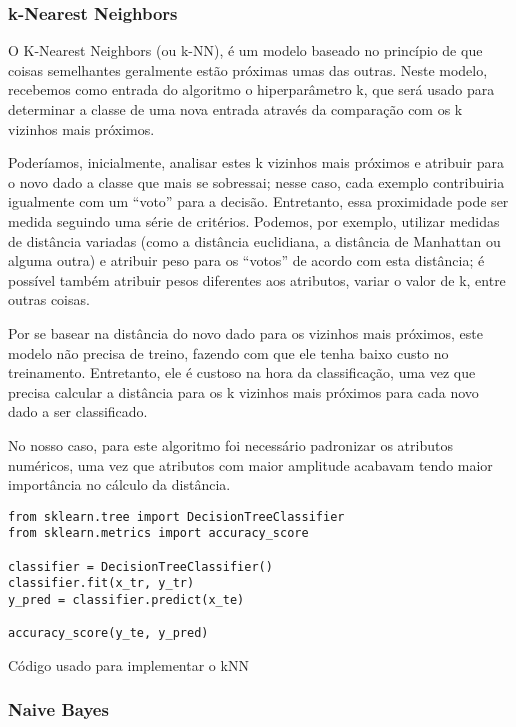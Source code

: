 \documentclass[]{IEEEphot}
\begin{document}
\subsubsection{k-Nearest Neighbors}

O K-Nearest Neighbors (ou k-NN), é um modelo baseado no princípio de que coisas semelhantes geralmente estão próximas umas das outras. Neste modelo, recebemos como entrada do algoritmo o hiperparâmetro k, que será usado para determinar a classe de uma nova entrada através da comparação com os k vizinhos mais próximos. 

Poderíamos, inicialmente, analisar estes k vizinhos mais próximos e atribuir para o novo dado a classe que mais se sobressai; nesse caso, cada exemplo contribuiria igualmente com um “voto” para a decisão. Entretanto, essa proximidade pode ser medida seguindo uma série de critérios. Podemos, por exemplo, utilizar medidas de distância variadas (como a distância euclidiana, a distância de Manhattan ou alguma outra) e atribuir peso para os “votos” de acordo com esta distância; é possível também atribuir pesos diferentes aos atributos, variar o valor de k, entre outras coisas.

Por se basear na distância do novo dado para os vizinhos mais próximos, este modelo não precisa de treino, fazendo com que ele tenha baixo custo no treinamento. Entretanto, ele é custoso na hora da classificação, uma vez que precisa calcular a distância para os k vizinhos mais próximos para cada novo dado a ser classificado.

No nosso caso, para este algoritmo foi necessário padronizar os atributos numéricos, uma vez que atributos com maior amplitude acabavam tendo maior importância no cálculo da distância.


\begin{listing}[!ht]
\begin{verbatim}
from sklearn.tree import DecisionTreeClassifier
from sklearn.metrics import accuracy_score

classifier = DecisionTreeClassifier()
classifier.fit(x_tr, y_tr)
y_pred = classifier.predict(x_te)

accuracy_score(y_te, y_pred)
\end{verbatim}

\caption{Código usado para implementar o kNN}

\end{listing}

\subsubsection{Naive Bayes}
\end{document}

